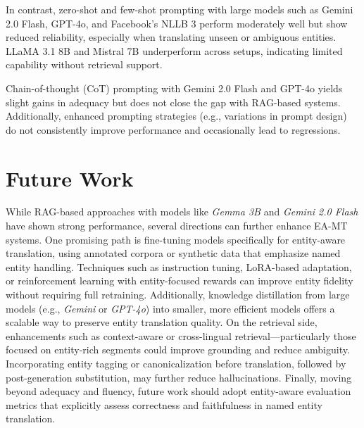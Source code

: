 \documentclass{ecai}
\begin{document}
In contrast, zero-shot and few-shot prompting with large models such as Gemini 2.0 Flash, GPT-4o, 
and Facebook's NLLB 3 perform moderately well but show reduced reliability, especially when translating unseen or 
ambiguous entities. LLaMA 3.1 8B and Mistral 7B underperform across setups, indicating limited capability without retrieval 
support.

Chain-of-thought (CoT) prompting with Gemini 2.0 Flash and GPT-4o yields slight gains in adequacy but does not 
close the gap with RAG-based systems. Additionally, enhanced prompting strategies (e.g., variations in prompt design) 
do not consistently improve performance and occasionally lead to regressions.

\section{Future Work}
\label{sec:future_work}
While RAG-based approaches with models like \textit{Gemma 3B} and \textit{Gemini 2.0 Flash} have shown strong performance, 
several directions can further enhance EA-MT systems. One promising path is fine-tuning models specifically for 
entity-aware translation, using annotated corpora or synthetic data that emphasize named entity handling. 
Techniques such as instruction tuning, LoRA-based adaptation, or reinforcement learning with entity-focused rewards 
can improve entity fidelity without requiring full retraining. 
Additionally, knowledge distillation from large models (e.g., \textit{Gemini} or \textit{GPT-4o}) into smaller, 
more efficient models offers a scalable way to preserve entity translation quality. On the retrieval side,
enhancements such as context-aware or cross-lingual retrieval—particularly those focused on entity-rich segments 
could improve grounding and reduce ambiguity. Incorporating entity tagging or canonicalization before translation, 
followed by post-generation substitution, may further reduce hallucinations. 
Finally, moving beyond adequacy and fluency, future work should adopt entity-aware evaluation metrics that explicitly 
assess correctness and faithfulness in named entity translation.
    

\end{document}
